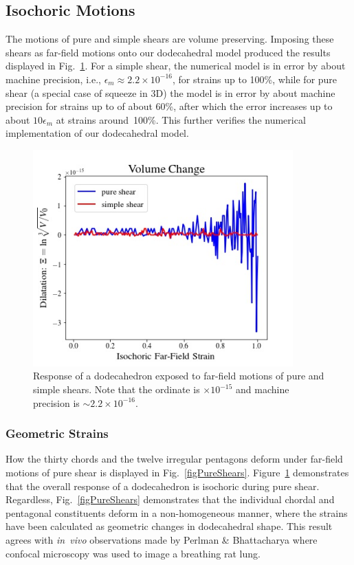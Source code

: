 \subsection{Isochoric Motions}

The motions of pure and simple shears are volume preserving.  Imposing these shears as far-field motions onto our dodecahedral model produced the results displayed in Fig.~\ref{figIsochoric}.  For a simple shear, the numerical model is in error by about machine precision, i.e., $\epsilon_m \approx 2.2 \times 10^{-16}$, for strains up to 100\%, while for pure shear (a special case of squeeze in 3D) the model is in error by about machine precision for strains up to of about 60\%, after which the error increases up to about $10\epsilon_m$ at strains around~100\%.  This further verifies the numerical implementation of our dodecahedral model.

\begin{figure}
	\centering
	\includegraphics[width=10cm]{figures/isochoric.jpg}
	\caption{Response of a dodecahedron exposed to far-field motions of pure and simple shears.  Note that the ordinate is $\times 10^{-15}$ and machine precision is $\sim 2.2 \times 10^{-16}$.}
	\label{figIsochoric}
\end{figure}

\subsubsection{Geometric Strains}

How the thirty chords and the twelve irregular pentagons deform under far-field motions of pure shear is displayed in Fig.~\ref{figPureShears}.  Figure~\ref{figIsochoric} demonstrates that the overall response of a dodecahedron is isochoric during pure shear.  Regardless, Fig.~\ref{figPureShears} demonstrates that the individual chordal and pentagonal constituents deform in a non-homogeneous manner, where the strains have been calculated as geometric changes in dodecahedral shape.  This result agrees with \textit{in~vivo\/} observations made by Perlman \& Bhattacharya \cite{PerlmanBhattacharya07} where confocal microscopy was used to image a breathing rat lung.

